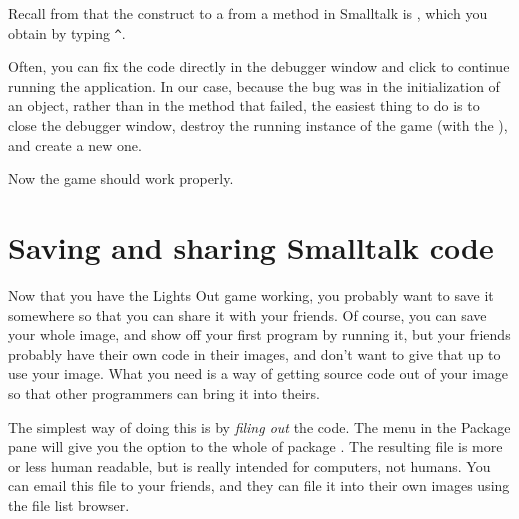 \documentclass[a4paper,10pt,twoside]{book}
\begin{document}
{\noindent
Recall from  that the construct to  a  from a method in Smalltalk is \ct{^}, which you obtain by typing \verb|^|.

Often, you can fix the code directly in the debugger window and click  to continue running the application.
In our case, because the bug was in the initialization of an object, rather than in the method that failed, the easiest thing to do is to close the debugger window, destroy the running instance of the game (with the ), and create a new one.


Now the game should work properly.


\section{Saving and sharing Smalltalk code}

Now that you have the Lights Out game working, you probably want to save it somewhere so that you can share it with your friends. Of course, you can save your whole \pharo image, and show off your first program by running it, but your friends probably have their own code in their images, and don't want to give that up to use your image.
What you need is a way of getting source code out of your \pharo image so that other programmers can bring it into theirs.

The simplest way of doing this is by \emph{filing out} the code.  The \actclick menu in the Package pane will give you the option to  the whole of package .
The resulting file is more or less human readable, but is really intended for computers, not humans.
You can email this file to your friends, and they can file it into their own \pharo images using the file list browser.

}
\end{document}
